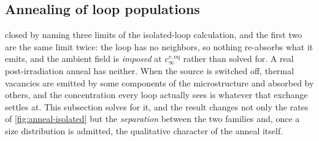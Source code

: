 \documentclass{article}
\begin{document}
\subsection{Annealing of loop populations}
\label{sec:anneal-population}

 closed by naming three limits of the isolated-loop
calculation, and the first two are the same limit twice: the loop has no
neighbors, so nothing re-absorbs what it emits, and the ambient field is
\emph{imposed} at $c^{v,\mathrm{eq}}_\infty$ rather than solved for. A real
post-irradiation anneal has neither. When the source is switched off, thermal
vacancies are emitted by some components of the microstructure and absorbed by
others, and the concentration every loop actually sees is whatever that exchange
settles at. This subsection solves for it, and the result changes not only the
rates of \cref{fig:anneal-isolated} but the \emph{separation} between the two
families and, once a size distribution is admitted, the qualitative character of
the anneal itself.
\end{document}
